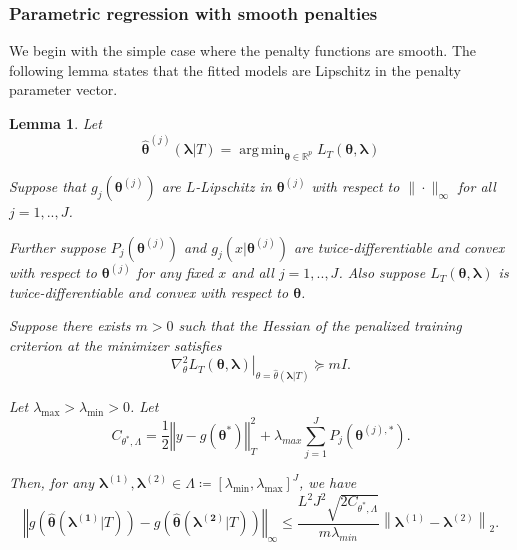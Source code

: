 \documentclass[12pt]{article} %
\newtheorem{lemma}{Lemma}
\theoremstyle{definition}
\DeclareMathOperator*{\argmin}{arg\,min}
\begin{document}
\subsubsection{Parametric regression with smooth penalties}
\label{sec:param_smooth}
We begin with the simple case where the penalty functions are smooth. The following lemma states that the fitted models are Lipschitz in the penalty parameter vector.
\begin{lemma}
	\label{lemma:param_add}
	Let 
	\begin{equation}
	\label{eq:param_add_estimator}
	\hat{\boldsymbol{\theta}}^{(j)}\left (\boldsymbol{\lambda} | T \right )  = 
	\argmin_{\boldsymbol{\theta} \in \mathbb{R}^p} L_T \left (\boldsymbol{\theta}, \boldsymbol{\lambda} \right)
	\end{equation}
	
	\noindent
	Suppose that $g_j(\boldsymbol{\theta}^{(j)})$ are $L$-Lipschitz in $\boldsymbol{\theta}^{(j)}$ with respect to $\| \cdot \|_\infty$ for all $j=1,..,J$.
	
	\noindent
	Further suppose $P_j(\boldsymbol{\theta}^{(j)})$ and $g_j(x | \boldsymbol{\theta}^{(j)})$ are twice-differentiable and convex with respect to $\boldsymbol{\theta}^{(j)}$ for any fixed $x$ and all $j=1,..,J$. Also suppose $L_T \left (\boldsymbol{\theta}, \boldsymbol{\lambda} \right)$ is twice-differentiable and convex with respect to $\boldsymbol{\theta}$.
	
	Suppose there exists $m > 0$ such that the Hessian of the penalized training criterion at the minimizer satisfies 
	\begin{equation}
	\left . \nabla_{\theta}^2 L_T \left (\boldsymbol{\theta}, \boldsymbol{\lambda} \right) \right |_{\theta = \hat{\theta}(\boldsymbol{\lambda} | T )} \succeq mI.
	\end{equation}
	
	Let $\lambda_{\max} > \lambda_{\min} > 0 $. Let
	\begin{equation}
	C_{\theta^{*},\Lambda}=
	\frac{1}{2}\left\Vert y- g(\boldsymbol{\theta}^{*})\right\Vert _{T}^{2}
	+\lambda_{max}\sum_{j=1}^{J} P_{j}(\boldsymbol{\theta}^{(j),*}).
	\end{equation}
	
	Then, for any $\boldsymbol{\lambda}^{(1)}, \boldsymbol{\lambda}^{(2)} \in \Lambda \coloneqq \left [ \lambda_{\min}, \lambda_{\max} \right ]^J$, we have
	\begin{equation}
	\label{eq:param_add_lipschitz}
	\left\Vert g\left(\hat{\boldsymbol{\theta}}(\boldsymbol{\lambda^{(1)}} | T)\right)-
	g\left(\hat{\boldsymbol{\theta}}(\boldsymbol{\lambda^{(2)}}| T)\right)\right\Vert _{\infty}
	\le
	\frac{L^{2}J^{2}\sqrt{2C_{\theta^{*},\Lambda}}}{m \lambda_{min}}
	\left \|\boldsymbol{\lambda}^{(1)}-\boldsymbol{\lambda}^{(2)} \right \|_2.
	\end{equation}
\end{lemma}
\end{document}

